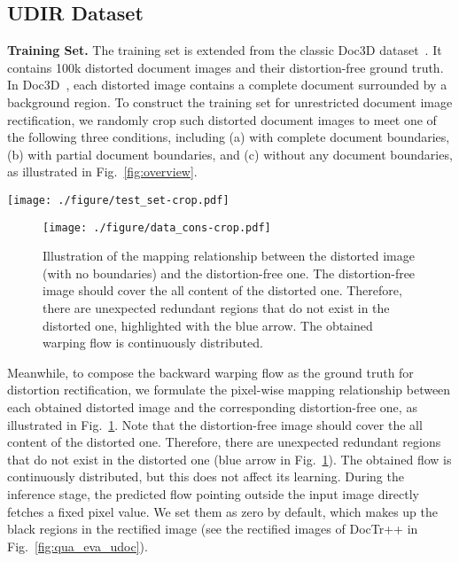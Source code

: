 \documentclass[lettersize,journal]{IEEEtran}
\begin{document}
\subsection{UDIR Dataset}\label{UDIR}
\textbf{Training Set.}
The training set is extended from the classic Doc3D dataset~\cite{9010747}.
It contains 100k distorted document images and their distortion-free ground truth.
In Doc3D~\cite{9010747}, each distorted image contains a complete document surrounded by a background region. 
To construct the training set for unrestricted document image rectification, we randomly crop such distorted document images to meet one of the following three conditions, including (a) with complete document boundaries, (b) with partial document boundaries, and (c) without any document boundaries, as illustrated in Fig.~\ref{fig:overview}.

\begin{figure*}[t]
  \centering
  \texttt{[image: ./figure/test\_set-crop.pdf]}
  \caption{Sample images in the UDIR test set. The first and second rows show the distorted and ground truth images, respectively. (a), (b), and (c) represent the images with complete document boundaries, with partial document boundaries, and without any document boundaries, respectively.}
  \label{fig:test_set}
\end{figure*}


\begin{figure}[t]
  \centering
  \texttt{[image: ./figure/data\_cons-crop.pdf]}
  \caption{Illustration of the mapping relationship between the distorted image (with no boundaries) and the distortion-free one. The distortion-free image should cover the all content of the distorted one. Therefore, there are unexpected redundant regions that do not exist in the distorted one, highlighted with the blue arrow.
  The obtained warping flow is continuously distributed.}
  \label{fig:data_cons}
\end{figure}


Meanwhile, to compose the backward warping flow as the ground truth for distortion rectification, we formulate the pixel-wise mapping relationship between each obtained distorted image and the corresponding distortion-free one,
as illustrated in Fig.~\ref{fig:data_cons}.
Note that the distortion-free image should cover the all content of the distorted one.
Therefore, there are unexpected redundant regions that do not exist in the distorted one (blue arrow in Fig.~\ref{fig:data_cons}).
The obtained flow is continuously distributed, but this does not affect its learning.
During the inference stage, the predicted flow pointing outside the input image directly fetches a fixed pixel value.
We set them as zero by default, which makes up the black regions in the rectified image (see the rectified images of DocTr++ in Fig.~\ref{fig:qua_eva_udoc}). 
\end{document}
